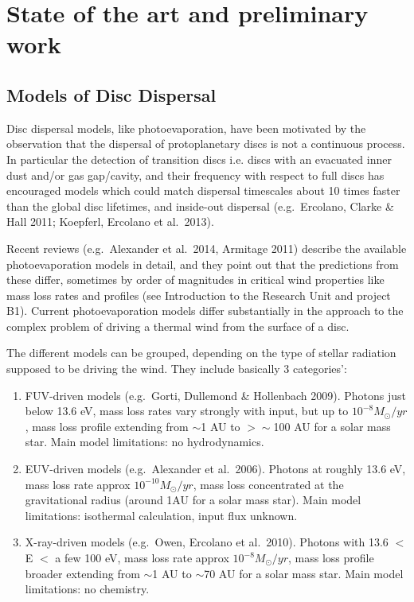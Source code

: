 \documentclass[10pt,fleqn,twoside]{article}
\begin{document}
\section{State of the art and preliminary work}
\renewcommand{\leftmark}{\sc State of the Art and preliminary work}

\subsection{Models of Disc Dispersal}

Disc dispersal models, like photoevaporation, have been motivated by
the observation that the dispersal of protoplanetary discs is
not a continuous process. In particular the detection of transition
discs i.e. discs with an evacuated inner dust
and/or gas gap/cavity, and their frequency with respect to full discs
has encouraged models which could match dispersal
timescales about 10 times faster than the global disc
lifetimes, and inside-out dispersal  (e.g.\ Ercolano, Clarke \& Hall 2011;
Koepferl, Ercolano et al.\ 2013). 

Recent reviews (e.g.\ Alexander et al.\ 2014, Armitage 2011) describe
the available photoevaporation models in detail, and they point out that the
predictions from these differ, sometimes by order of magnitudes in
critical wind properties like mass loss rates and profiles (see
Introduction to the Research Unit and project B1). Current
photoevaporation models differ
substantially in the approach to the complex problem of driving a
thermal wind from the surface of a disc. 

The different models can be grouped, depending on
the type of stellar radiation supposed to be driving the wind. They
include basically 3 categories':

\begin{enumerate}
\item FUV-driven models (e.g.\ Gorti, Dullemond \& Hollenbach
  2009). Photons just below 13.6 eV, mass loss rates vary strongly
  with input, but up to $10^{-8}M_{\odot}/yr$, mass
loss profile extending from $\sim$1 AU to  $>\sim$100 AU for a
solar mass star. Main model limitations: no hydrodynamics. 
\item EUV-driven models (e.g.\ Alexander et al.\ 2006). Photons at
  roughly 13.6 eV, mass loss rate approx $10^{-10}M_{\odot}/yr$, mass
loss concentrated at the gravitational radius (around 1AU for a solar
mass star). Main model limitations: isothermal calculation, input flux
unknown. 
\item X-ray-driven models (e.g.\ Owen, Ercolano et al.\ 2010). Photons
  with 13.6 $<$ E $<$ a few 100 eV, mass loss rate approx $10^{-8}M_{\odot}/yr$, mass
loss profile broader extending from $\sim$1 AU to  $\sim$70 AU for a solar
mass star. Main model limitations: no chemistry. 
\end{enumerate}
\end{document}
